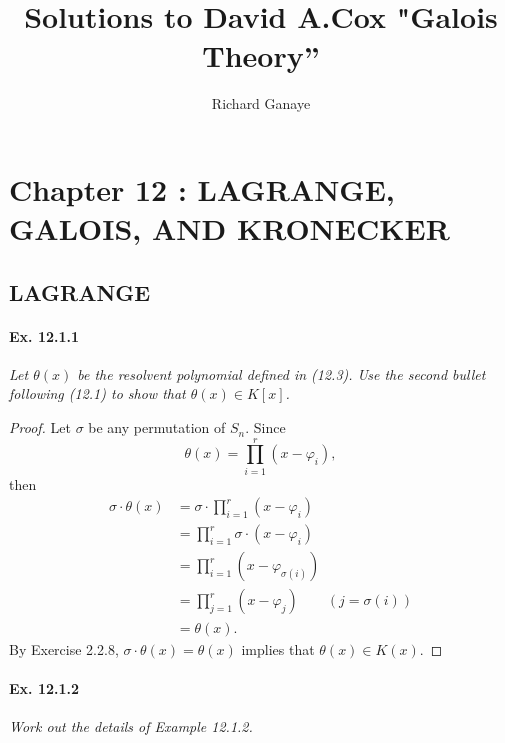 \documentclass[11pt,a4paper]{article}
\title{Solutions to David A.Cox  "Galois Theory''}
\author{Richard Ganaye}
\begin{document}
\maketitle

\section{Chapter 12 : LAGRANGE, GALOIS, AND KRONECKER}

\subsection{LAGRANGE}
\paragraph{Ex. 12.1.1}

{\it Let $\theta(x)$ be the resolvent polynomial defined in (12.3). Use the second bullet following (12.1) to show that $\theta(x) \in K[x]$.
}

\begin{proof} Let $\sigma$ be any permutation of $S_n$. Since 
$$\theta(x) = \prod_{i=1}^r (x-\varphi_i),$$
then
\begin{align*}
\sigma \cdot \theta(x) &= \sigma \cdot  \prod_{i=1}^r (x-\varphi_i)\\
&= \prod_{i=1}^r \sigma \cdot (x-\varphi_i)\\
&= \prod_{i=1}^r   (x-\varphi_{\sigma(i)})\\
&= \prod_{j=1}^r   (x-\varphi_j) \qquad (j = \sigma(i))\\
&=\theta(x).
\end{align*}
By  Exercise 2.2.8, $\sigma \cdot \theta(x)  = \theta(x)$ implies that $\theta(x) \in K(x)$.
\end{proof}

\paragraph{Ex. 12.1.2}

{\it Work out the details of Example 12.1.2.
}
\end{document}
